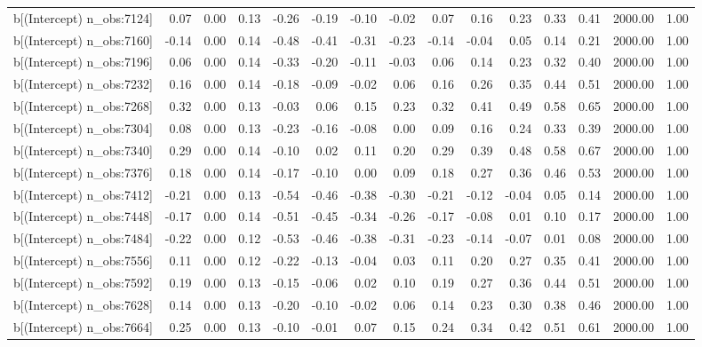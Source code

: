 \begin{table}[ht]
\begin{tabular}{rrrrrrrrrrrrrrr}
  b[(Intercept) n\_obs:7124] & 0.07 & 0.00 & 0.13 & -0.26 & -0.19 & -0.10 & -0.02 & 0.07 & 0.16 & 0.23 & 0.33 & 0.41 & 2000.00 & 1.00 \\ 
  b[(Intercept) n\_obs:7160] & -0.14 & 0.00 & 0.14 & -0.48 & -0.41 & -0.31 & -0.23 & -0.14 & -0.04 & 0.05 & 0.14 & 0.21 & 2000.00 & 1.00 \\ 
  b[(Intercept) n\_obs:7196] & 0.06 & 0.00 & 0.14 & -0.33 & -0.20 & -0.11 & -0.03 & 0.06 & 0.14 & 0.23 & 0.32 & 0.40 & 2000.00 & 1.00 \\ 
  b[(Intercept) n\_obs:7232] & 0.16 & 0.00 & 0.14 & -0.18 & -0.09 & -0.02 & 0.06 & 0.16 & 0.26 & 0.35 & 0.44 & 0.51 & 2000.00 & 1.00 \\ 
  b[(Intercept) n\_obs:7268] & 0.32 & 0.00 & 0.13 & -0.03 & 0.06 & 0.15 & 0.23 & 0.32 & 0.41 & 0.49 & 0.58 & 0.65 & 2000.00 & 1.00 \\ 
  b[(Intercept) n\_obs:7304] & 0.08 & 0.00 & 0.13 & -0.23 & -0.16 & -0.08 & 0.00 & 0.09 & 0.16 & 0.24 & 0.33 & 0.39 & 2000.00 & 1.00 \\ 
  b[(Intercept) n\_obs:7340] & 0.29 & 0.00 & 0.14 & -0.10 & 0.02 & 0.11 & 0.20 & 0.29 & 0.39 & 0.48 & 0.58 & 0.67 & 2000.00 & 1.00 \\ 
  b[(Intercept) n\_obs:7376] & 0.18 & 0.00 & 0.14 & -0.17 & -0.10 & 0.00 & 0.09 & 0.18 & 0.27 & 0.36 & 0.46 & 0.53 & 2000.00 & 1.00 \\ 
  b[(Intercept) n\_obs:7412] & -0.21 & 0.00 & 0.13 & -0.54 & -0.46 & -0.38 & -0.30 & -0.21 & -0.12 & -0.04 & 0.05 & 0.14 & 2000.00 & 1.00 \\ 
  b[(Intercept) n\_obs:7448] & -0.17 & 0.00 & 0.14 & -0.51 & -0.45 & -0.34 & -0.26 & -0.17 & -0.08 & 0.01 & 0.10 & 0.17 & 2000.00 & 1.00 \\ 
  b[(Intercept) n\_obs:7484] & -0.22 & 0.00 & 0.12 & -0.53 & -0.46 & -0.38 & -0.31 & -0.23 & -0.14 & -0.07 & 0.01 & 0.08 & 2000.00 & 1.00 \\ 
  b[(Intercept) n\_obs:7556] & 0.11 & 0.00 & 0.12 & -0.22 & -0.13 & -0.04 & 0.03 & 0.11 & 0.20 & 0.27 & 0.35 & 0.41 & 2000.00 & 1.00 \\ 
  b[(Intercept) n\_obs:7592] & 0.19 & 0.00 & 0.13 & -0.15 & -0.06 & 0.02 & 0.10 & 0.19 & 0.27 & 0.36 & 0.44 & 0.51 & 2000.00 & 1.00 \\ 
  b[(Intercept) n\_obs:7628] & 0.14 & 0.00 & 0.13 & -0.20 & -0.10 & -0.02 & 0.06 & 0.14 & 0.23 & 0.30 & 0.38 & 0.46 & 2000.00 & 1.00 \\ 
  b[(Intercept) n\_obs:7664] & 0.25 & 0.00 & 0.13 & -0.10 & -0.01 & 0.07 & 0.15 & 0.24 & 0.34 & 0.42 & 0.51 & 0.61 & 2000.00 & 1.00 \\ 

\end{tabular}
\end{table}

